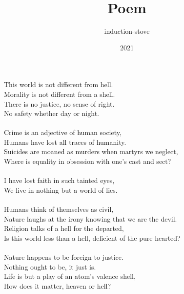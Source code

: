 \documentclass{article}
\title{Poem}
\author{induction-stove}
\date{2021}
\begin{document}
\maketitle
This world is not different from hell.
\\Morality is not different from a shell.
\\There is no justice, no sense of right.
\\No safety whether day or night.
\\\\Crime is an adjective of human society,
\\Humans have lost all traces of humanity.
\\Suicides are moaned as murders when martyrs we neglect,
\\Where is equality in obsession with one's cast and sect?
\\\\I have lost faith in such tainted eyes,
\\We live in nothing but a world of lies.
\\\\Humans think of themselves as civil,
\\Nature laughs at the irony knowing that we are the devil.
\\Religion talks of a hell for the departed,
\\Is this world less than a hell, deficient of the pure hearted?
\\\\Nature happens to be foreign to justice.
\\Nothing ought to be, it just is.
\\Life is but a play of an atom's valence shell,
\\How does it matter, heaven or hell?
\end{document}
